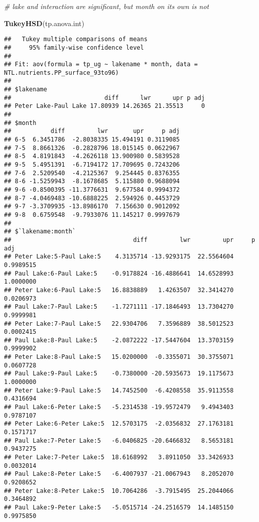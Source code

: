 \documentclass[
]{article}
\newenvironment{Shaded}{\begin{snugshade}}{\end{snugshade}}
\newcommand{\CommentTok}[1]{\textcolor[rgb]{0.56,0.35,0.01}{\textit{#1}}}
\newcommand{\KeywordTok}[1]{\textcolor[rgb]{0.13,0.29,0.53}{\textbf{#1}}}
\newcommand{\NormalTok}[1]{#1}
\begin{document}
\begin{Shaded}
\begin{Highlighting}[]
\CommentTok{# lake and interaction are significant, but month on its own is not}

\KeywordTok{TukeyHSD}\NormalTok{(tp.anova.int)}
\end{Highlighting}
\end{Shaded}

\begin{verbatim}
##   Tukey multiple comparisons of means
##     95% family-wise confidence level
## 
## Fit: aov(formula = tp_ug ~ lakename * month, data = NTL.nutrients.PP_surface_93to96)
## 
## $lakename
##                          diff      lwr      upr p adj
## Peter Lake-Paul Lake 17.80939 14.26365 21.35513     0
## 
## $month
##           diff         lwr       upr     p adj
## 6-5  6.3451786  -2.8038335 15.494191 0.3119085
## 7-5  8.8661326  -0.2828796 18.015145 0.0622967
## 8-5  4.8191843  -4.2626118 13.900980 0.5839528
## 9-5  5.4951391  -6.7194172 17.709695 0.7243206
## 7-6  2.5209540  -4.2125367  9.254445 0.8376355
## 8-6 -1.5259943  -8.1678685  5.115880 0.9688094
## 9-6 -0.8500395 -11.3776631  9.677584 0.9994372
## 8-7 -4.0469483 -10.6888225  2.594926 0.4453729
## 9-7 -3.3709935 -13.8986170  7.156630 0.9012092
## 9-8  0.6759548  -9.7933076 11.145217 0.9997679
## 
## $`lakename:month`
##                                  diff         lwr         upr     p adj
## Peter Lake:5-Paul Lake:5    4.3135714 -13.9293175  22.5564604 0.9989515
## Paul Lake:6-Paul Lake:5    -0.9178824 -16.4886641  14.6528993 1.0000000
## Peter Lake:6-Paul Lake:5   16.8838889   1.4263507  32.3414270 0.0206973
## Paul Lake:7-Paul Lake:5    -1.7271111 -17.1846493  13.7304270 0.9999981
## Peter Lake:7-Paul Lake:5   22.9304706   7.3596889  38.5012523 0.0002415
## Paul Lake:8-Paul Lake:5    -2.0872222 -17.5447604  13.3703159 0.9999902
## Peter Lake:8-Paul Lake:5   15.0200000  -0.3355071  30.3755071 0.0607728
## Paul Lake:9-Paul Lake:5    -0.7380000 -20.5935673  19.1175673 1.0000000
## Peter Lake:9-Paul Lake:5   14.7452500  -6.4208558  35.9113558 0.4316694
## Paul Lake:6-Peter Lake:5   -5.2314538 -19.9572479   9.4943403 0.9787107
## Peter Lake:6-Peter Lake:5  12.5703175  -2.0356832  27.1763181 0.1571717
## Paul Lake:7-Peter Lake:5   -6.0406825 -20.6466832   8.5653181 0.9437275
## Peter Lake:7-Peter Lake:5  18.6168992   3.8911050  33.3426933 0.0032014
## Paul Lake:8-Peter Lake:5   -6.4007937 -21.0067943   8.2052070 0.9208652
## Peter Lake:8-Peter Lake:5  10.7064286  -3.7915495  25.2044066 0.3464892
## Paul Lake:9-Peter Lake:5   -5.0515714 -24.2516579  14.1485150 0.9975850

\end{verbatim}
\end{document}
